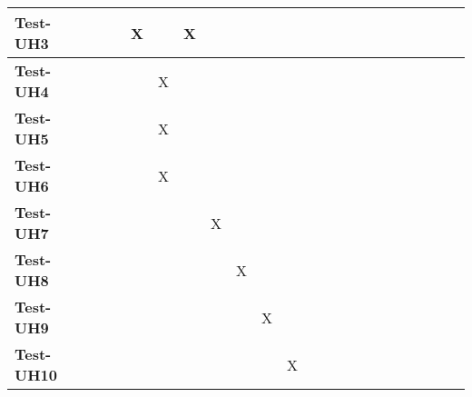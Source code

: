 \documentclass[12pt, titlepage]{article}
\begin{document}
\begin{landscape}
\begin{table}[H]
\begin{adjustwidth}{-0.3in}{-0.5in}
{\begin{tabular}{c|c|c|c|c|c|c|c|c|c|c|c|c|c|c|c|c|c|c|c|c|c|}
\multicolumn{1}{|l|}{\textbf{Test-UH3}}   &             &             &             &     X        &              &     X        &             &             &              &              &              &              &             &             &             &       &  &&&&     \\ \hline
\multicolumn{1}{|l|}{\textbf{Test-UH4}}   &              &              &              &              &    X          &              &             &             &             &             &             &             &              &              &            &     &  &&&&       \\ \hline
\multicolumn{1}{|l|}{\textbf{Test-UH5}}   &             &             &             &             &      X       &             &             &             &              &              &              &              &             &             &             &      &   &&&&     \\ \hline
\multicolumn{1}{|l|}{\textbf{Test-UH6}}   &             &             &              &             &      X       &             &             &             &              &              &              &              &             &             &             &      &  &&&&      \\ \hline
\multicolumn{1}{|l|}{\textbf{Test-UH7}}   &             &             &              &             &             &           &     X        &             &              &              &              &              &             &             &             &      &  &&&&      \\ \hline
\multicolumn{1}{|l|}{\textbf{Test-UH8}}   &             &             &              &             &             &           &             & X            &              &              &              &              &             &             &             &      &  &&&&      \\ \hline
\multicolumn{1}{|l|}{\textbf{Test-UH9}}   &             &             &              &             &             &           &             &             &      X        &              &              &              &             &             &             &      &  &&&&      \\ \hline
\multicolumn{1}{|l|}{\textbf{Test-UH10}}   &             &             &              &             &             &           &             &             &              &        X      &              &              &             &             &             &      &  &&&&      \\ \hline

\end{tabular}}
\end{adjustwidth}
\end{table}
\end{landscape}
\end{document}
